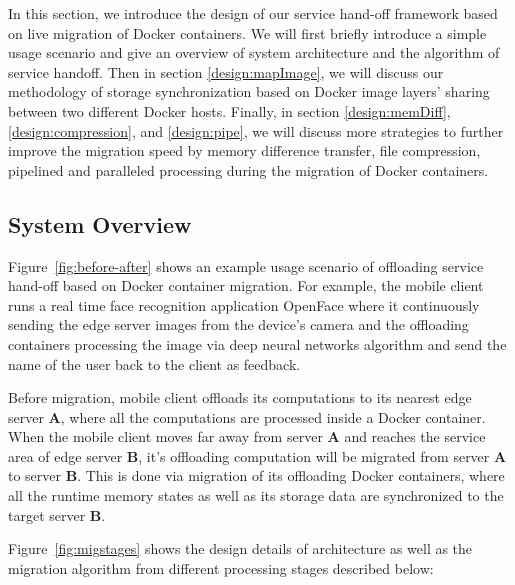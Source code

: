


In this section, we introduce the design of our service hand-off framework based on live migration of Docker containers. We will first briefly introduce a simple usage scenario and give an overview of system architecture and the algorithm of service handoff. Then in section \ref{design:mapImage}, we will discuss our methodology of storage synchronization based on Docker image layers' sharing between two different Docker hosts. Finally, in section \ref{design:memDiff}, \ref{design:compression}, and \ref{design:pipe}, we will discuss more strategies to further improve the migration speed by memory difference transfer, file compression, pipelined and paralleled processing during the migration of Docker containers.

\subsection{System Overview}

Figure~\ref{fig:before-after} shows an example usage scenario of offloading service hand-off based on Docker container migration. 
For example, the mobile client runs a real time face recognition application OpenFace\cite{openface2016} where it continuously sending the edge server images from the device's camera and the offloading containers processing the image via deep neural networks algorithm and send the name of the user back to the client as feedback.

Before migration, mobile client offloads its computations to its nearest edge server \textbf{A}, where all the computations are processed inside a Docker container. 
When the mobile client moves far away from server \textbf{A} and reaches the service area of edge server \textbf{B}, it's offloading computation will be migrated from server \textbf{A} to server \textbf{B}. This is done via migration of its offloading Docker containers, where all the runtime memory states as well as its storage data are synchronized to the target server \textbf{B}.




Figure~\ref{fig:migstages} shows the design details of architecture as well as the migration algorithm from different processing stages described below:

